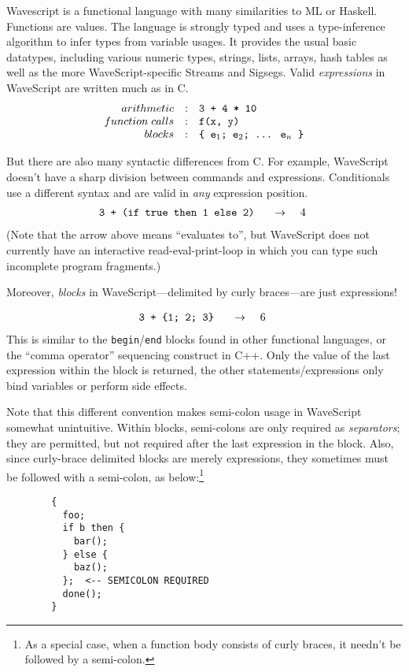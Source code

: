 \documentclass[twocolumn]{report}
\newcommand{\evalsto}[2]{\[ \begin{array}{rcl}
$\tt #1 $&$ \arr $&$ #2 $
\end{array} \]}
\newcommand{\arr}{\ensuremath{\rightarrow}}
\newcommand{\ws}{WaveScript}
\begin{document}
Wavescript is a functional language with many similarities to ML or
Haskell.  Functions are values.  The language is strongly typed and uses a
type-inference algorithm to infer types from variable usages.
It provides the usual basic datatypes, including various
numeric types, strings, lists, arrays, hash tables as well as the more
WaveScript-specific Streams and Sigsegs.  Valid {\em expressions} in
WaveScript are written much as in C.
\[
\begin{array}{rcl}
arithmetic       & : & $\tt 3 + 4 * 10 $  \\
function\; calls & : & $\tt f(x, y)$  \\
blocks           & : & $\tt \{ e$_1$; e$_2$; \ldots$\:$ e$_n$ \}$  \\
\end{array}
\]

But there are also many syntactic differences from C.  For example,
WaveScript doesn't have a sharp division between commands and
expressions.  Conditionals use a different syntax and are valid in
{\em any}
expression position.
%
\evalsto{3 + (if true then 1 else 2)} {4}
%
(Note that the arrow above means ``evaluates to'', but {\ws} does not
currently have an interactive read-eval-print-loop in which you can
type such incomplete program fragments.)

Moreover, {\em blocks} in WaveScript---delimited by curly
braces---are just expressions!

\evalsto{3 + \{1; 2; 3\}} {6}
%
This is similar to the {\tt begin}/{\tt end} blocks found in other
functional languages, or the ``comma operator'' sequencing construct
in C++.  Only the value of the last expression within the block is
returned, the other statements/expressions only bind variables or
perform side effects.

Note that this different convention makes semi-colon usage in
WaveScript somewhat unintuitive.  Within blocks, semi-colons are only
required as {\em separators}; they are permitted, but not required
after the last expression in the block.  Also, since curly-brace
delimited blocks are merely expressions, they sometimes must be
followed with a semi-colon, as below:\footnote{As a special case, when
a function body consists of curly braces, it needn't be followed by a semi-colon.}

\begin{verbatim}
        {
          foo;
          if b then {
            bar();
          } else {
            baz();
          };  <-- SEMICOLON REQUIRED
          done();
        }
\end{verbatim}
\end{document}
